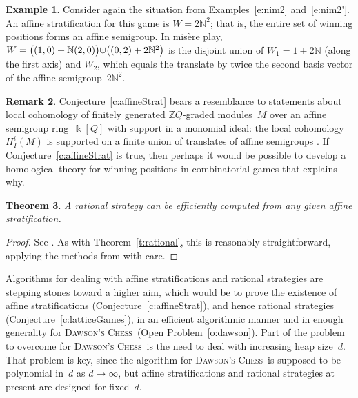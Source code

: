 \documentclass[12pt]{amsart}
\numberwithin{equation}{section}
\newtheorem{thm}{Theorem}[section]
\theoremstyle{definition}
\newtheorem{remark}[thm]{Remark}
\newtheorem{example}[thm]{Example}
\begin{document}
\begin{example}\label{e:nim2''}
Consider again the situation from Examples~\ref{e:nim2}
and~\ref{e:nim2'}.  An affine stratification for this game is $W =
2{\mathbb{N}}^2$; that is, the entire set of winning positions forms an affine
semigroup.  In mis\`ere play, $W = \big((1,0) + {\mathbb{N}}(2,0)\big) {\ensuremath{\mathbin{\mathaccent\cdot\cup}}}
\big((0,2) + 2{\mathbb{N}}^2\big)$ is the disjoint union of $W_1 = 1 + 2{\mathbb{N}}$
(along the first axis) and $W_2$, which equals the translate by twice
the second basis vector of the affine semigroup~$2{\mathbb{N}}^2$.
\end{example}

\begin{remark}
Conjecture~\ref{c:affineStrat} bears a resemblance to statements about
local cohomology of finitely generated ${\mathbb{Z}} Q$-graded modules~$M$ over
an affine semigroup ring~${\Bbbk}[Q]$ with support in a monomial ideal:
the local cohomology $H^i_I(M)$ is supported on a finite union of
translates of affine semigroups \cite{injAlg}.  If
Conjecture~\ref{c:affineStrat} is true, then perhaps it would be
possible to develop a homological theory for winning positions in
combinatorial games that explains why.
\end{remark}

\begin{thm}\label{t:strat}
A rational strategy can be efficiently computed from any given affine
stratification.
\end{thm}
\begin{proof}
See \cite[\S5]{algsCGT}.  As with Theorem~\ref{t:rational}, this is
reasonably straightforward, applying the methods from \cite{bw03} with
care.
\end{proof}

Algorithms for dealing with affine stratifications and rational
strategies are stepping stones toward a higher aim, which would be to
prove the existence of affine stratifications
(Conjecture~\ref{c:affineStrat}), and hence rational strategies
(Conjecture~\ref{c:latticeGames}), in an efficient algorithmic manner
and in enough generality for {\textsc{Dawson's Chess}}\ (Open Problem~\ref{o:dawson}).
Part of the problem to overcome for {\textsc{Dawson's Chess}}\ is the need to deal with
increasing heap size~$d$.  That problem is key, since the algorithm
for {\textsc{Dawson's Chess}}\ is supposed to be polynomial in~$d$ as $d \to \infty$,
but affine stratifications and rational strategies at present are
designed for fixed~$d$.
\end{document}
